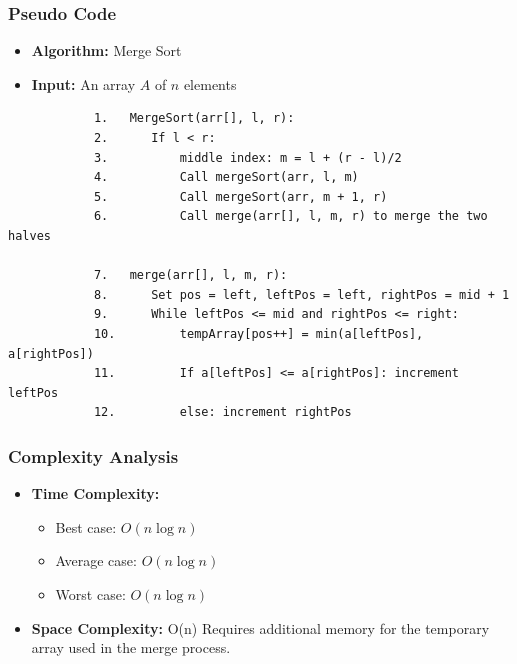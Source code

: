     \subsubsection{Pseudo Code}
        \begin{itemize}
            \item \textbf{Algorithm:} Merge Sort
            \item \textbf{Input:} An array $A$ of $n$ elements
        \end{itemize}
        \begin{verbatim}
            1.   MergeSort(arr[], l, r):
            2.      If l < r:
            3.          middle index: m = l + (r - l)/2
            4.          Call mergeSort(arr, l, m)
            5.          Call mergeSort(arr, m + 1, r)
            6.          Call merge(arr[], l, m, r) to merge the two halves

            7.   merge(arr[], l, m, r):
            8.      Set pos = left, leftPos = left, rightPos = mid + 1
            9.      While leftPos <= mid and rightPos <= right:
            10.         tempArray[pos++] = min(a[leftPos], a[rightPos])
            11.         If a[leftPos] <= a[rightPos]: increment leftPos
            12.         else: increment rightPos
        \end{verbatim}
    \subsubsection{Complexity Analysis}
        \begin{itemize}
            \item \textbf{Time Complexity:}
            \begin{itemize}
                \item Best case: $O(n \log n)$
                \item Average case: $O(n \log n)$
                \item Worst case: $O(n \log n)$ 
            \end{itemize}
            \item \textbf{Space Complexity:} O(n) 
                \subitem Requires additional memory for the temporary array used in the merge process.
        \end{itemize}
        
